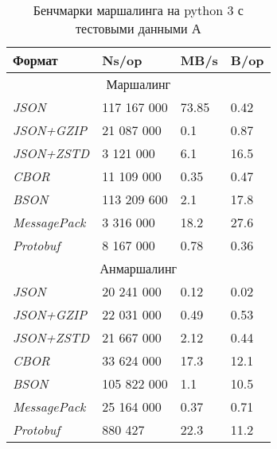 \begin{table}[ht!]
\centering
\caption{Бенчмарки маршалинга на python 3 с тестовыми данными А}
\begin{tabular}{|l|l|l|l|} 
\hline
\textbf{Формат}      & \textbf{Ns/op} & \textbf{MB/s} & \textbf{B/op}  \\ 
\hline
\multicolumn{4}{|c|}{Маршалинг}                                        \\ 
\hline
\textit{JSON}        & 117 167 000      &    73.85         &    0.42 \\ 
\hline
\textit{JSON+GZIP}   & 21 087 000       &     0.1          &    0.87 \\ 
\hline
\textit{JSON+ZSTD}   & 3 121 000        &    6.1           &    16.5 \\ 
\hline
\textit{CBOR}        & 11 109 000       &    0.35           &   0.47 \\ 
\hline
\textit{BSON}        & 113 209 600      &    2.1           &    17.8    \\ 
\hline
\textit{MessagePack} & 3 316 000        &     18.2          &   27.6 \\ 
\hline
\textit{Protobuf}    & 8 167 000        &     0.78          &   0.36 \\ 
\hline
\multicolumn{4}{|c|}{Анмаршалинг}                                      \\ 
\hline
\textit{JSON}        & 20 241 000       &    0.12           &   0.02 \\ 
\hline
\textit{JSON+GZIP}   & 22 031 000       &    0.49           &   0.53 \\ 
\hline
\textit{JSON+ZSTD}   & 21 667 000       &     2.12          &   0.44 \\ 
\hline
\textit{CBOR}        & 33 624 000       &     17.3          &   12.1 \\ 
\hline
\textit{BSON}        & 105 822 000      &     1.1          &    10.5 \\ 
\hline
\textit{MessagePack} & 25 164 000       &     0.37          &   0.71 \\ 
\hline
\textit{Protobuf}    & 880 427         &     22.3           &   11.2 \\
\hline
\end{tabular}
\end{table}